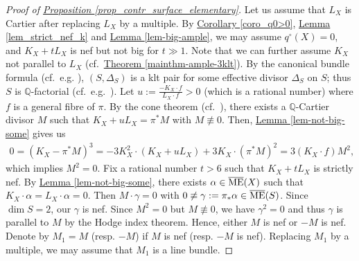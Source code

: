 \begin{proof}[Proof of {\hyperref[prop_contr_surface_elementary]{Proposition   \ref*{prop_contr_surface_elementary}}}]
Let us assume that $L_X$ is Cartier after replacing $L_X$ by a multiple. 
By {\hyperref[coro_q0>0]{Corollary   \ref*{coro_q0>0}}}, {\hyperref[lem_strict_nef_k]{Lemma  \ref*{lem_strict_nef_k}}} and {\hyperref[lem-big-ample]{Lemma  \ref*{lem-big-ample}}}, we may assume $q^\circ(X)=0$, and $K_X+tL_X$ is nef but not big for  $t\gg 1$. 
Note that we can further assume $K_X$ not parallel to $L_X$ (cf.~{\hyperref[mainthm-ample-3klt]{Theorem \ref*{mainthm-ample-3klt}}}).  
By the canonical bundle formula (cf.~e.g. \cite[Theorem 0.2]{Amb05}), $(S,\Delta_S)$ is a klt pair for some effective divisor $\Delta_S$ on $S$; thus $S$ is $\mathbb{Q}$-factorial (cf.~e.g.~\cite[Proposition 4.11]{KM98}).
Let $u:=\frac{-K_X\cdot f}{L_X\cdot f}>0$ (which is a rational number) where $f$ is a general fibre of $\pi$.
By the cone theorem (cf.~\cite[Theorem 3.7]{KM98}), there exists a $\mathbb{Q}$-Cartier divisor $M$ such that
$K_X+uL_X=\pi^*M$ with $M\not\equiv 0$.  
Then, {\hyperref[lem-not-big-some]{Lemma  \ref*{lem-not-big-some}}} gives us 
\begin{align*}
0=(K_X-\pi^*M)^3=-3K_X^2\cdot(K_X+uL_X)+3K_X\cdot(\pi^*M)^2=3(K_X\cdot f)M^2,
\end{align*}
which implies  $M^2=0$.  
Fix a rational number $t>6$ such that  $K_X+tL_X$ is strictly nef.  
By {\hyperref[lem-not-big-some]{Lemma  \ref*{lem-not-big-some}}},  there exists  $\alpha\in\overline{\textup{ME}}(X)$ such that $K_X\cdot\alpha=L_X\cdot \alpha=0$.
Then $M\cdot \gamma=0$ with $0\not\equiv\gamma:=\pi_*\alpha\in\overline{\textup{ME}}(S)$.
Since $\dim S=2$, our $\gamma$ is nef.
Since $M^2=0$ but $M\not\equiv0$, we have $\gamma^2=0$ and thus $\gamma$ is parallel to $M$ by the Hodge index theorem. 
Hence, either $M$  is nef or $-M$ is nef.
Denote by $M_1=M$ (resp. $-M$) if $M$ is nef (resp. $-M$ is nef). 
Replacing $M_1$ by a multiple, we may assume that $M_1$ is a line bundle.


\end{proof}
